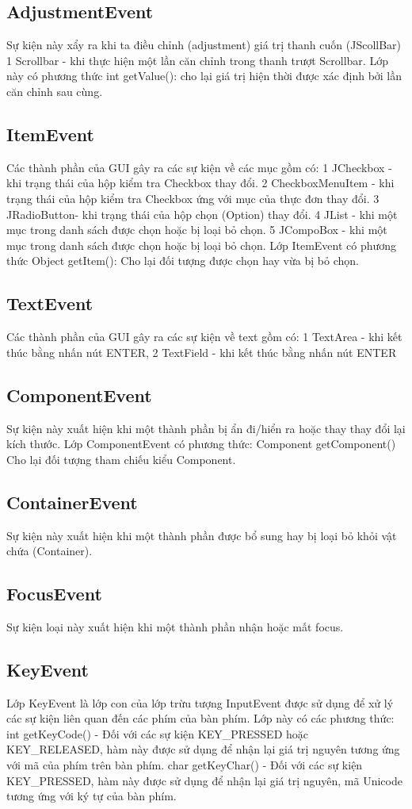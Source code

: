 \subsection{ AdjustmentEvent}
Sự kiện này xẩy ra khi ta điều chỉnh (adjustment) giá trị thanh cuốn (JScollBar)
1 Scrollbar - khi thực hiện một lần căn chỉnh trong thanh trượt Scrollbar.
Lớp này có phương thức int getValue(): cho lại giá trị hiện thời được xác định bởi
lần căn chỉnh sau cùng.
\subsection{  ItemEvent}
Các thành phần của GUI gây ra các sự kiện về các mục gồm có:
1 JCheckbox - khi trạng thái của hộp kiểm tra Checkbox thay đổi.
2 CheckboxMenuItem - khi trạng thái của hộp kiểm tra Checkbox ứng với
mục của thực đơn thay đổi.
3 JRadioButton- khi trạng thái của hộp chọn (Option) thay đổi.
4 JList - khi một mục trong danh sách được chọn hoặc bị loại bỏ chọn.
5 JCompoBox - khi một mục trong danh sách được chọn hoặc bị loại bỏ
chọn.
Lớp ItemEvent có phương thức Object getItem(): Cho lại đối tượng được chọn
hay vừa bị bỏ chọn.
\subsection{  TextEvent}
Các thành phần của GUI gây ra các sự kiện về text gồm có:
1 TextArea - khi kết thúc bằng nhấn nút ENTER,
2 TextField - khi kết thúc bằng nhấn nút ENTER
\subsection{  ComponentEvent}
Sự kiện này xuất hiện khi một thành phần bị ẩn đi/hiển ra hoặc thay thay đổi lại
kích thước. Lớp ComponentEvent có phương thức:
Component getComponent()
Cho lại đối tượng tham chiếu kiểu Component.
\subsection{  ContainerEvent}
Sự kiện này xuất hiện khi một thành phần được bổ sung hay bị loại bỏ khỏi
vật chứa (Container).
\subsection{  FocusEvent}
Sự kiện loại này xuất hiện khi một thành phần nhận hoặc mất focus.
\subsection{  KeyEvent}
Lớp KeyEvent là lớp con của lớp trừu tượng InputEvent được sử dụng để
xử lý các sự kiện liên quan đến các phím của bàn phím. Lớp này có các phương
thức:
int getKeyCode()
- Đối với các sự kiện KEY\_PRESSED hoặc KEY\_RELEASED, hàm này được sử
dụng để nhận lại giá trị nguyên tương ứng với mã của phím trên bàn phím.
char getKeyChar()
- Đối với các sự kiện KEY\_PRESSED, hàm này được sử dụng để nhận lại giá trị
nguyên, mã Unicode tương ứng với ký tự của bàn phím.
